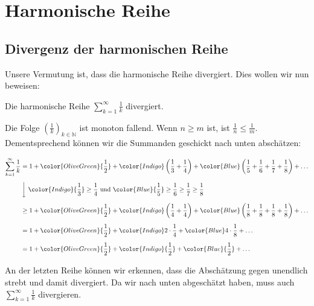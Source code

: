 \documentclass[fontsize=9pt,
               parskip=half-,
               DIV=14,
               listof=chapterentry,
               tocflat]{scrbook}
\begin{document}
\section{Harmonische Reihe}

\subsection{Divergenz der harmonischen Reihe}

Unsere Vermutung ist, dass die harmonische Reihe divergiert. Dies wollen wir nun beweisen:

\begin{theorem*}
Die harmonische Reihe $\sum _{k=1}^{\infty }{\frac {1}{k}}$ divergiert.

\end{theorem*}

\begin{solutionprocess*}
Die Folge $\left({\tfrac {1}{k}}\right)_{k\in \mathbb {N} }$ ist monoton fallend. Wenn $n\geq m$ ist, ist ${\tfrac {1}{n}}\leq {\tfrac {1}{m}}$. Dementsprechend können wir die Summanden geschickt nach unten abschätzen:

\begin{align*}
\sum _{k=1}^{\infty }{\frac {1}{k}}&=1+{\color {OliveGreen}{\frac {1}{2}}}+{\color {Indigo}\left({\frac {1}{3}}+{\frac {1}{4}}\right)}+{\color {Blue}\left({\frac {1}{5}}+{\frac {1}{6}}+{\frac {1}{7}}+{\frac {1}{8}}\right)}+\ldots \\[0.5em]&\left\downarrow \ {\color {Indigo}{\frac {1}{3}}\geq {\frac {1}{4}}}{\text{ und }}{\color {Blue}{\frac {1}{5}}\geq {\frac {1}{6}}\geq {\frac {1}{7}}\geq {\frac {1}{8}}}\right.\\[0.5em]&\geq 1+{\color {OliveGreen}{\frac {1}{2}}}+{\color {Indigo}\left({\frac {1}{4}}+{\frac {1}{4}}\right)}+{\color {Blue}\left({\frac {1}{8}}+{\frac {1}{8}}+{\frac {1}{8}}+{\frac {1}{8}}\right)}+\ldots \\[0.5em]&=1+{\color {OliveGreen}{\frac {1}{2}}}+{\color {Indigo}2\cdot {\frac {1}{4}}}+{\color {Blue}4\cdot {\frac {1}{8}}}+\ldots \\[0.5em]&=1+{\color {OliveGreen}{\frac {1}{2}}}+{\color {Indigo}{\frac {1}{2}}}+{\color {Blue}{\frac {1}{2}}}+\ldots 
\end{align*}

An der letzten Reihe können wir erkennen, dass die Abschätzung gegen unendlich strebt und damit divergiert. Da wir nach unten abgeschätzt haben, muss auch $\sum _{k=1}^{\infty }{\frac {1}{k}}$ divergieren. 

\end{solutionprocess*}
\end{document}
